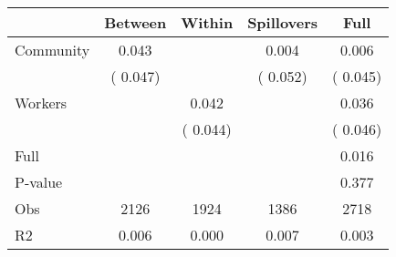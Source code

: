 
\begin{tabular}{l*{4}{c}}\hline&\multicolumn{1}{c}{Between}&\multicolumn{1}{c}{Within}&\multicolumn{1}{c}{Spillovers}&\multicolumn{1}{c}{Full}\\ \hline
 Community             &              0.043      &                                               &        0.004 &         0.006                            \\ 
                               &        (       0.047)           &                                       &       (       0.052)     &      (       0.045)                                           \\ 
 Workers       &                                               &        0.042    &                                &             0.036                            \\ 
                               &                                               & (       0.044)                  &                                        &      (       0.046)                                           \\ 
\hline                                                                                                                                                                                                                                            
 Full                  &                                               &                                               &                                        &             0.016                                     \\ 
 P-value               &                                               &                                               &                                        &             0.377                                           \\ 
 Obs                   &               2126               &       1924                       &       1386                &              2718                                               \\ 
 R2                    &                      0.006              &              0.000                      &              0.007               &                     0.003                                              \\ 
\hline \end{tabular}                                                                                                                                                                                                              